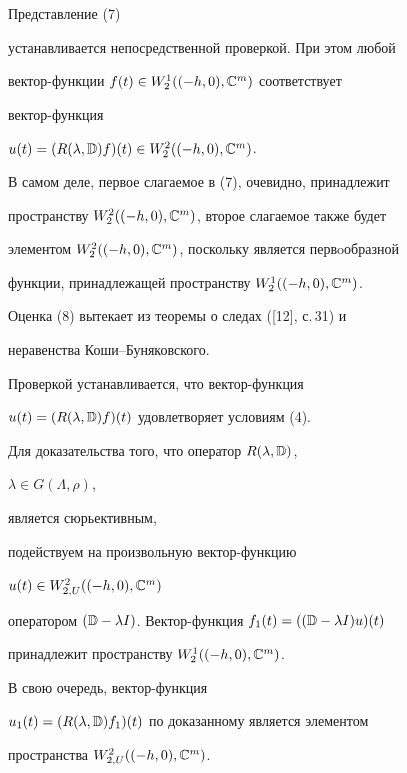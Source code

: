 \begin{pf} 


Представление (7) 


устанавливается непосредственной проверкой. При этом любой 


вектор-функции $f(t)\in W^{1}_{2}((-h,0),\Bbb C^m)$ соответствует 


вектор-функция 


$u(t)=(R(\lambda,\Bbb D)f)(t)\in W^{2}_{2}((-h,0),\Bbb C^m)$. 


В самом деле, первое слагаемое в (7), очевидно, принадлежит 


пространству $W^{2}_{2}((-h,0),\Bbb C^m)$, второе слагаемое также будет 


элементом $W^{2}_{2}((-h,0),\Bbb C^m)$, поскольку является первoобразной 


функции, принадлежащей пространству $W^{1}_{2}((-h,0),\Bbb C^m)$. 


 


Оценка (8) вытекает из теоремы о следах ([12], с.\,31) и 


неравенства Коши--Буняковского. 


 


Проверкой устанавливается, что вектор-функция 


$u(t)=(R(\lambda,\Bbb D)f)(t)$ удовлетворяет условиям (4). 


 


Для доказательства того, что оператор $R(\lambda,\Bbb D)$, 


$\lambda\in G(\Lambda,\rho)$, 


является сюрьективным,


подействуем на произвольную вектор-функцию 


$u(t)\in W^{2}_{2,U}((-h,0),\Bbb C^m)$


оператором $(\Bbb D-\lambda I)$. Вектор-функция $f_1(t)=((\Bbb 


D-\lambda I)u)(t)$ 


принадлежит пространству $W^{1}_{2}((-h,0),\Bbb C^m)$. 


В свою очередь, вектор-функция 


$u_1(t)=(R(\lambda,\Bbb D)f_1)(t)$ по доказанному является элементом 


пространства $W^{2}_{2,U}((-h,0),\Bbb C^m)$. 


 



\end{pf}
